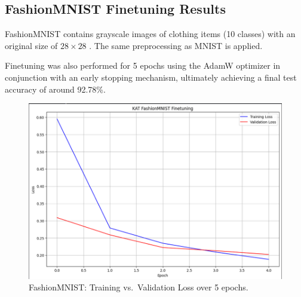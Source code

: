 \documentclass[conference]{IEEEtran}
\begin{document}
\subsection{FashionMNIST Finetuning Results}
FashionMNIST contains grayscale images of clothing items (10 classes) with an
original size of $28\times28$ \cite{fashionmnist}. The same preprocessing as
MNIST is applied.

Finetuning was also performed for 5 epochs using the AdamW optimizer in
conjunction with an early stopping mechanism, ultimately achieving a final test
accuracy of around 92.78\%.

\begin{figure}[H]
    \centering
    \includegraphics[width=0.55\linewidth]{fashionmnist_train_loss.png}
    \caption{FashionMNIST: Training vs.\ Validation Loss over 5 epochs.}
    \label{fig:fashionmnist_loss}
\end{figure}
\end{document}
